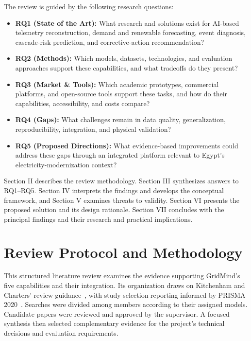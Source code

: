 \documentclass[journal,letterpaper]{IEEEtran}
\begin{document}
The review is guided by the following research questions:
\begin{itemize}
\item \textbf{RQ1 (State of the Art):} What research and solutions exist for AI-based telemetry reconstruction, demand and renewable forecasting, event diagnosis, cascade-risk prediction, and corrective-action recommendation?
\item \textbf{RQ2 (Methods):} Which models, datasets, technologies, and evaluation approaches support these capabilities, and what tradeoffs do they present?
\item \textbf{RQ3 (Market \& Tools):} Which academic prototypes, commercial platforms, and open-source tools support these tasks, and how do their capabilities, accessibility, and costs compare?
\item \textbf{RQ4 (Gaps):} What challenges remain in data quality, generalization, reproducibility, integration, and physical validation?
\item \textbf{RQ5 (Proposed Directions):} What evidence-based improvements could address these gaps through an integrated platform relevant to Egypt's electricity-modernization context?
\end{itemize}
Section II describes the review methodology. Section III synthesizes answers to RQ1--RQ5. Section IV interprets the findings and develops the conceptual framework, and Section V examines threats to validity. Section VI presents the proposed solution and its design rationale. Section VII concludes with the principal findings and their research and practical implications.

\section{Review Protocol and Methodology}
This structured literature review examines the evidence supporting GridMind's five capabilities and their integration. Its organization draws on Kitchenham and Charters' review guidance~\cite{Kitchenham}, with study-selection reporting informed by PRISMA 2020~\cite{PRISMA}. Searches were divided among members according to their assigned models. Candidate papers were reviewed and approved by the supervisor. A focused synthesis then selected complementary evidence for the project's technical decisions and evaluation requirements.
\end{document}
